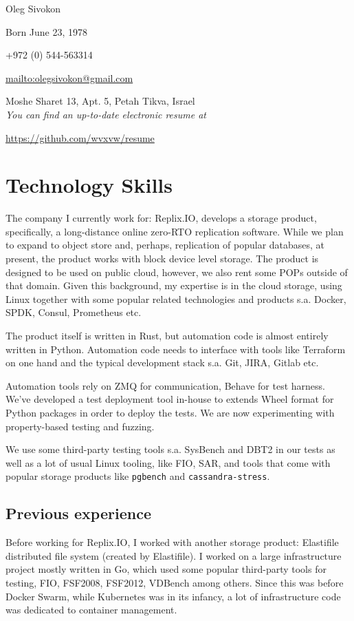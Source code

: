 \documentclass[11pt]{article}
\author{Oleg Sivokon}
\date{\textit{<2019-07-24 Wed>}}
\title{}
\begin{document}
\begin{center}
Oleg Sivokon

Born June 23, 1978

+972 (0) 544-563314

\url{mailto:olegsivokon@gmail.com}

Moshe Sharet 13, Apt. 5, Petah Tikva, Israel \\[18pt]

\small \emph{You can find an up-to-date electronic resume at}

\url{https://github.com/wvxvw/resume} \\[48pt]
\end{center}

\section*{Technology Skills}
\label{sec:orge525f21}
The company I currently work for: Replix.IO, develops a storage
product, specifically, a long-distance online zero-RTO replication
software.  While we plan to expand to object store and, perhaps,
replication of popular databases, at present, the product works with
block device level storage.  The product is designed to be used on
public cloud, however, we also rent some POPs outside of that
domain.  Given this background, my expertise is in the cloud
storage, using Linux together with some popular related technologies
and products s.a. Docker, SPDK, Consul, Prometheus etc.

The product itself is written in Rust, but automation code is almost
entirely written in Python.  Automation code needs to interface with
tools like Terraform on one hand and the typical development stack
s.a. Git, JIRA, Gitlab etc.

Automation tools rely on ZMQ for communication, Behave for test
harness.  We've developed a test deployment tool in-house to extends
Wheel format for Python packages in order to deploy the tests.  We
are now experimenting with property-based testing and fuzzing.

We use some third-party testing tools s.a. SysBench and DBT2 in our
tests as well as a lot of usual Linux tooling, like FIO, SAR, and
tools that come with popular storage products like \texttt{pgbench} and
\texttt{cassandra-stress}.

\subsection*{Previous experience}
\label{sec:org419ecbe}
Before working for Replix.IO, I worked with another storage
product: Elastifile distributed file system (created by
Elastifile).  I worked on a large infrastructure project mostly
written in Go, which used some popular third-party tools for
testing, FIO, FSF2008, FSF2012, VDBench among others.  Since this
was before Docker Swarm, while Kubernetes was in its infancy, a lot
of infrastructure code was dedicated to container management.
\end{document}
